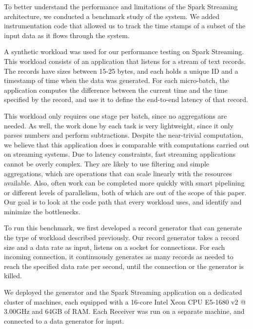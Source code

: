 To better understand the performance and limitations of the Spark Streaming architecture, we conducted a benchmark study of the system. We added instrumentation code that allowed us to track the time stamps of a subset of the input data as it flows through the system.

A synthetic workload was used for our performance testing on Spark Streaming.
This workload consists of an application that listens for a stream of text records.
The records have sizes between 15-25 bytes, and each holds a unique ID and a timestamp of time when the data was generated.
For each micro-batch, the application computes the difference between the current time and the time specified by the record, and use it to define the end-to-end latency of that record.

This workload only requires one stage per batch, since no aggregations are needed. As well, the work done by each task is very lightweight, since it only parses numbers and perform subtractions.
Despite the near-trivial computation, we believe that this application does is comparable with computations carried out on streaming systems. Due to latency constraints, fast streaming applications cannot be overly complex. They are likely to use filtering and simple aggregations, which are operations that can scale linearly with the resources available.
Also, often work can be completed more quickly with smart pipelining or different levels of parallelism, both of which are out of the scope of this paper. Our goal is to look at the code path that every workload uses, and identify and minimize the bottlenecks.


To run this benchmark, we first developed a record generator that can generate the type of workload described previously. Our record generator takes a record size and a data rate as input, listens on a socket for connections. For each incoming connection, it continuously generates as many records as needed to reach the specified data rate per second, until the connection or the generator is killed.

We deployed the generator and the Spark Streaming application on a dedicated cluster of machines, each equipped with a 16-core Intel Xeon CPU E5-1680 v2 @ 3.00GHz and 64GB of RAM. Each Receiver was run on a separate machine, and connected to a data generator for input.

